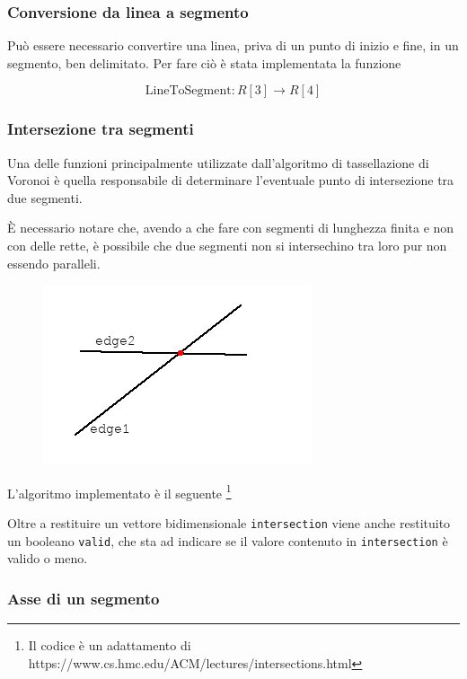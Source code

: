 \documentclass[10pt,a4paper]{article}
\newcommand{\modelicaclass}[1]{

}
\begin{document}
\subsubsection{Conversione da linea a segmento}

Può essere necessario convertire una linea, priva di un punto di inizio e fine, in un segmento, ben delimitato. Per fare ciò è stata implementata la funzione

\[
	\text{LineToSegment} : R[3] \longrightarrow R[4]
\]

\modelicaclass{LineToSegment.mo}

\subsubsection{Intersezione tra segmenti}

Una delle funzioni principalmente utilizzate dall'algoritmo di tassellazione di Voronoi è quella responsabile di determinare l'eventuale punto di intersezione tra due segmenti.

È necessario notare che, avendo a che fare con segmenti di lunghezza finita e non con delle rette, è possibile che due segmenti non si intersechino tra loro pur non essendo paralleli.

\begin{figure}[H]
\centering
\includegraphics[scale=0.5]{intersection.png}
\end{figure}

L'algoritmo implementato è il seguente \footnote{Il codice è un adattamento di https://www.cs.hmc.edu/ACM/lectures/intersections.html}

\modelicaclass{SegmentsIntersection.mo}

Oltre a restituire un vettore bidimensionale \verb|intersection| viene anche restituito un booleano \verb|valid|, che sta ad indicare se il valore contenuto in \verb|intersection| è valido o meno.

\subsubsection{Asse di un segmento}
\end{document}
